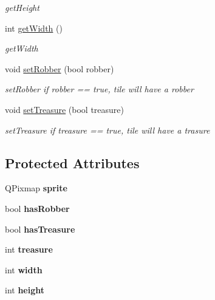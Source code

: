 \begin{DoxyCompactItemize}
\begin{DoxyCompactList}\small\item\em get\-Height \end{DoxyCompactList}\item 
int \hyperlink{class_game_1_1_game_tile_base_a0b02032614ded5bc23ed81bd81cef6cf}{get\-Width} ()
\begin{DoxyCompactList}\small\item\em get\-Width \end{DoxyCompactList}\item 
void \hyperlink{class_game_1_1_game_tile_base_a0be2dfb1431a55bce1f84b29645ae932}{set\-Robber} (bool robber)
\begin{DoxyCompactList}\small\item\em set\-Robber if robber == true, tile will have a robber \end{DoxyCompactList}\item 
void \hyperlink{class_game_1_1_game_tile_base_a2bc4d0458c01992cc5a975d119765551}{set\-Treasure} (bool treasure)
\begin{DoxyCompactList}\small\item\em set\-Treasure if treasure == true, tile will have a trasure \end{DoxyCompactList}\end{DoxyCompactItemize}
\subsection*{Protected Attributes}
\begin{DoxyCompactItemize}
\item 
\hypertarget{class_game_1_1_game_tile_base_a2d72336befccee4083acae3e36bbc40e}{Q\-Pixmap {\bfseries sprite}}\label{class_game_1_1_game_tile_base_a2d72336befccee4083acae3e36bbc40e}

\item 
\hypertarget{class_game_1_1_game_tile_base_a64279e63a53c5a9d8f44e50493eac9c6}{bool {\bfseries has\-Robber}}\label{class_game_1_1_game_tile_base_a64279e63a53c5a9d8f44e50493eac9c6}

\item 
\hypertarget{class_game_1_1_game_tile_base_a5ddf32ac3c7cda213c767879a12d5610}{bool {\bfseries has\-Treasure}}\label{class_game_1_1_game_tile_base_a5ddf32ac3c7cda213c767879a12d5610}

\item 
\hypertarget{class_game_1_1_game_tile_base_ad939859fa92994f157d7728b60b3dbff}{int {\bfseries treasure}}\label{class_game_1_1_game_tile_base_ad939859fa92994f157d7728b60b3dbff}

\item 
\hypertarget{class_game_1_1_game_tile_base_ad0ee0109c45a8091f2bc202d4a4ab0ff}{int {\bfseries width}}\label{class_game_1_1_game_tile_base_ad0ee0109c45a8091f2bc202d4a4ab0ff}

\item 
\hypertarget{class_game_1_1_game_tile_base_aef220c70f71d82800229b071e52689a3}{int {\bfseries height}}\label{class_game_1_1_game_tile_base_aef220c70f71d82800229b071e52689a3}

\end{DoxyCompactItemize}


